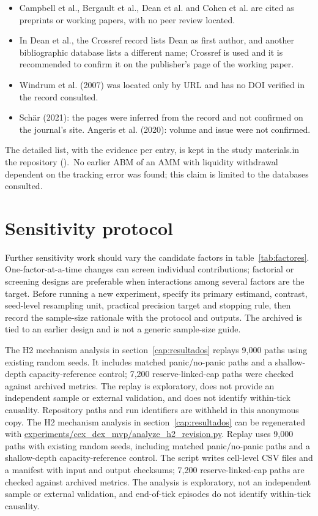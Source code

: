 \begin{itemize}
  \item Campbell et al., Bergault et al., Dean et al. and Cohen et al. are cited as preprints or working papers, with no peer review located.
  \item In Dean et al., the Crossref record lists Dean as first author, and another bibliographic database lists a different name; Crossref is used and it is recommended to confirm it on the publisher's page of the working paper.
  \item Windrum et al. (2007) was located only by URL and has no DOI verified in the record consulted.
  \item Schär (2021): the pages were inferred from the record and not confirmed on the journal's site. Angeris et al. (2020): volume and issue were not confirmed.
\end{itemize}

The detailed list, with the evidence per entry, is kept \ifdefined\blindreviewmode in the study materials.\else in the repository ().\fi\ No earlier ABM of an AMM with liquidity withdrawal dependent on the tracking error was found; this claim is limited to the databases consulted.

\section{Sensitivity protocol}
\label{sec:sensibilidad}

Further sensitivity work should vary the candidate factors in table~\ref{tab:factores}. One-factor-at-a-time changes can screen individual contributions; factorial or screening designs \cite{morris1991factorial,saltelli2010variance} are preferable when interactions among several factors are the target. Before running a new experiment, specify its primary estimand, contrast, seed-level resampling unit, practical precision target and stopping rule, then record the sample-size rationale with the protocol and outputs. The archived  is tied to an earlier design and is not a generic sample-size guide.

\ifdefined\blindreviewmode
The H2 mechanism analysis in section~\ref{cap:resultados} replays 9,000 paths using existing random seeds. It includes matched panic/no-panic paths and a shallow-depth capacity-reference control; 7,200 reserve-linked-cap paths were checked against archived metrics. The replay is exploratory, does not provide an independent sample or external validation, and does not identify within-tick causality. Repository paths and run identifiers are withheld in this anonymous copy.
\else
The H2 mechanism analysis in section~\ref{cap:resultados} can be regenerated with  \url{experiments/cex_dex_mvp/analyze_h2_revision.py}. Replay \code{\HtwoReviewRunID} uses 9,000 paths with existing random seeds, including matched panic/no-panic paths and a shallow-depth capacity-reference control. The script writes cell-level CSV files and a manifest with input and output checksums; 7,200 reserve-linked-cap paths are checked against archived metrics. The analysis is exploratory, not an independent sample or external validation, and end-of-tick episodes do not identify within-tick causality.
\fi
